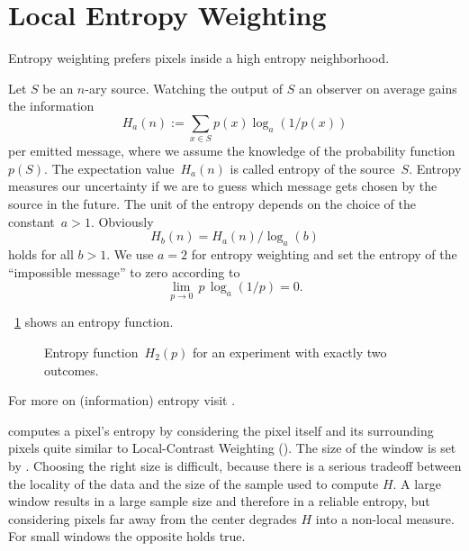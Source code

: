 

\section[Local Entropy Weighting]{\label{sec:local-entropy-weighting}%
  Local Entropy Weighting}

Entropy weighting prefers pixels inside a high entropy neighborhood.

Let $S$ be an $n$-ary source.  Watching the output of $S$ an observer
on average gains the information
\[
    H_a(n) := \sum_{x \in S} p(x) \log_a(1 / p(x))
\]
\noindent per emitted message, where we assume the knowledge of the probability function~$p(S)$.
The expectation value~$H_a(n)$ is called entropy of the source~$S$.  Entropy measures our
uncertainty if we are to guess which message gets chosen by the source in the future.  The unit
of the entropy depends on the choice of the constant~$a > 1$.  Obviously
\[
    H_b(n) = H_a(n) / \log_a(b)
\]
\noindent holds for all $b > 1$.  We use $a = 2$ for entropy weighting and set the entropy of
the ``impossible message'' to zero according to
\[
    \lim_{p \rightarrow 0} \, p \, \log_a(1 / p) = 0.
\]

\figureName~\ref{fig:entropy} shows an entropy function.


\begin{figure}[htbp]
  \ifreferencemanual\begin{maxipage}\fi
  \centering
  \ifreferencemanual\end{maxipage}\fi

  \caption[Entropy function]{\label{fig:entropy}%
    Entropy function~$H_2(p)$ for an experiment with exactly two outcomes.}
\end{figure}


For more on (information) entropy visit .

%
\App{} computes a pixel's entropy by considering the pixel itself and its surrounding pixels
quite similar to Local-Contrast Weighting ().  The size of
the window is set by .  Choosing the right size is difficult,
because there is a serious tradeoff between the locality of the data and the size of the sample
used to compute $H$.  A large window results in a large sample size and therefore in a reliable
entropy, but considering pixels far away from the center degrades $H$ into a non-local measure.
For small windows the opposite holds true.

